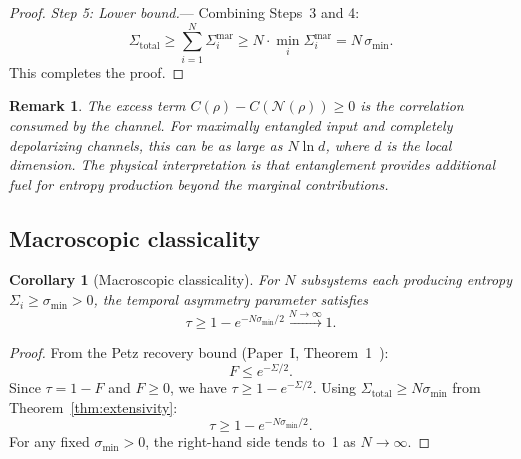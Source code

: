 \documentclass[letterpaper,twocolumn,superscriptaddress,longbibliography]{revtex4-2}
\newtheorem{corollary}[theorem]{Corollary}
\newtheorem*{remark}{Remark}
\newcommand{\chan}{\mathcal{N}}
\newcommand{\tauasym}{\tau}
\begin{document}
\begin{proof}
\emph{Step 5: Lower bound.}---
Combining Steps~3 and 4:
\begin{equation}
  \Sigma_{\mathrm{total}}
  \geq \sum_{i=1}^{N} \Sigma_i^{\mathrm{mar}}
  \geq N \cdot \min_i \Sigma_i^{\mathrm{mar}}
  = N \, \sigma_{\min}.
  \label{eq:final_bound}
\end{equation}
This completes the proof.
\end{proof}

\begin{remark}
The excess term $C(\rho) - C(\chan(\rho)) \geq 0$ is the
\emph{correlation consumed} by the channel.
For maximally entangled input and completely depolarizing channels,
this can be as large as $N \ln d$, where $d$ is the local dimension.
The physical interpretation is that entanglement provides
\emph{additional} fuel for entropy production beyond the marginal
contributions.
\end{remark}

\subsection{Macroscopic classicality}

\begin{corollary}[Macroscopic classicality]
\label{cor:macro}
For $N$ subsystems each producing entropy $\Sigma_i \geq \sigma_{\min}
> 0$, the temporal asymmetry parameter satisfies
\begin{equation}
  \tauasym \geq 1 - e^{-N\sigma_{\min}/2} \xrightarrow{N \to \infty} 1.
  \label{eq:tau_macro}
\end{equation}
\end{corollary}

\begin{proof}
From the Petz recovery bound (Paper~I,
Theorem~1~\cite{PaperI,JRSWW2018}):
\begin{equation}
  F \leq e^{-\Sigma/2}.
  \label{eq:Petz_bound}
\end{equation}
Since $\tauasym = 1 - F$ and $F \geq 0$, we have
$\tauasym \geq 1 - e^{-\Sigma/2}$.
Using $\Sigma_{\mathrm{total}} \geq N \sigma_{\min}$ from
Theorem~\ref{thm:extensivity}:
\begin{equation}
  \tauasym \geq 1 - e^{-N\sigma_{\min}/2}.
\end{equation}
For any fixed $\sigma_{\min} > 0$, the right-hand side tends to~1
as $N \to \infty$.
\end{proof}
\end{document}
